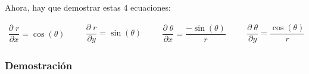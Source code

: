 \documentclass[12pt, fleqn]{report}                             %
\DeclareMathOperator \Space {\quad}                             %
\newcommand{\Wrap}[1]{\left( #1 \right)}                        %
\newcommand{\Cos}[1]{\cos\Wrap{#1}}                             %
\newcommand{\Sin}[1]{\sin\Wrap{#1}}                             %
\newcommand \Partial[2]                                        %
        {\dfrac{\partial \; #1}{\partial #2}}                      %
\begin{document}
                \clearpage

                Ahora, hay que demostrar estas 4 ecuaciones:

                \begin{equation*}
                    \begin{split}
                        \Partial{r}{x} = \Cos{\theta}
                    \end{split}
                    \Space
                    \begin{split}
                        \Partial{r}{y} = \Sin{\theta}
                    \end{split}
                    \Space
                    \begin{split}
                        \Partial{\theta}{x} = \dfrac{-\Sin{\theta}}{r}
                    \end{split}
                    \Space
                    \begin{split}
                        \Partial{\theta}{y} = \dfrac{\Cos{\theta}}{r}
                    \end{split}
                \end{equation*}


                \subsubsection{Demostración}
\end{document}
